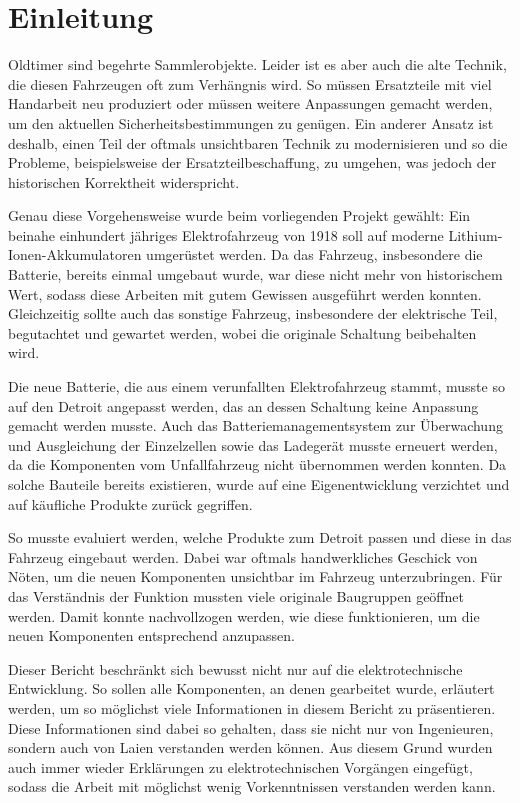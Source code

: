 \chapter{Einleitung}

Oldtimer sind begehrte Sammlerobjekte. Leider ist es aber auch die alte Technik, die diesen Fahrzeugen oft zum Verhängnis wird. So müssen Ersatzteile mit viel Handarbeit neu produziert oder müssen weitere Anpassungen gemacht werden, um den aktuellen Sicherheitsbestimmungen zu genügen. Ein anderer Ansatz ist deshalb, einen Teil der oftmals unsichtbaren Technik zu modernisieren und so die Probleme, beispielsweise der Ersatzteilbeschaffung, zu umgehen, was jedoch der historischen Korrektheit widerspricht.

Genau diese Vorgehensweise wurde beim vorliegenden Projekt gewählt: Ein beinahe einhundert jähriges Elektrofahrzeug von 1918 soll auf moderne Lithium-Ionen-Akkumulatoren umgerüstet werden. Da das Fahrzeug, insbesondere die Batterie, bereits einmal umgebaut wurde, war diese nicht mehr von historischem Wert, sodass diese Arbeiten mit gutem Gewissen ausgeführt werden konnten. Gleichzeitig sollte auch das sonstige Fahrzeug, insbesondere der elektrische Teil, begutachtet und gewartet werden, wobei die originale Schaltung beibehalten wird.

Die neue Batterie, die aus einem verunfallten Elektrofahrzeug stammt, musste so auf den Detroit angepasst werden, das an dessen Schaltung keine Anpassung gemacht werden musste. Auch das Batteriemanagementsystem zur Überwachung und Ausgleichung der Einzelzellen sowie das Ladegerät musste erneuert werden, da die Komponenten vom Unfallfahrzeug nicht übernommen werden konnten. Da solche Bauteile bereits existieren, wurde auf eine Eigenentwicklung verzichtet und auf käufliche Produkte zurück gegriffen.

So musste evaluiert werden, welche Produkte zum Detroit passen und diese in das Fahrzeug eingebaut werden. Dabei war oftmals handwerkliches Geschick von Nöten, um die neuen Komponenten unsichtbar im Fahrzeug unterzubringen. Für das Verständnis der Funktion mussten viele originale Baugruppen geöffnet werden. Damit konnte nachvollzogen werden, wie diese funktionieren, um die neuen Komponenten entsprechend anzupassen.

Dieser Bericht beschränkt sich bewusst nicht nur auf die elektrotechnische Entwicklung. So sollen alle Komponenten, an denen gearbeitet wurde, erläutert werden, um so möglichst viele Informationen in diesem Bericht zu präsentieren. Diese Informationen sind dabei so gehalten, dass sie nicht nur von Ingenieuren, sondern auch von Laien verstanden werden können. Aus diesem Grund wurden auch immer wieder Erklärungen zu elektrotechnischen Vorgängen eingefügt, sodass die Arbeit mit möglichst wenig Vorkenntnissen verstanden werden kann.